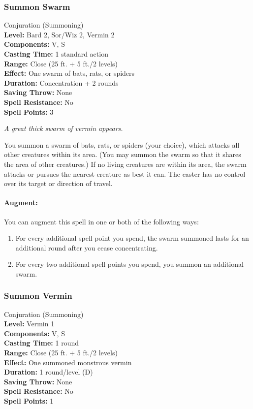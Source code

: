 \subsubsection{Summon Swarm}
\label{Spell:SummonSwarm}
Conjuration (Summoning)
\\ \textbf{Level:} Bard 2, Sor/Wiz 2, Vermin 2
\\ \textbf{Components:} V, S
\\ \textbf{Casting Time:} 1 standard action
\\ \textbf{Range:} Close (25 ft. + 5 ft./2 levels)
\\ \textbf{Effect:} One swarm of bats, rats, or spiders
\\ \textbf{Duration:} Concentration + 2 rounds
\\ \textbf{Saving Throw:} None
\\ \textbf{Spell Resistance:} No
\\ \textbf{Spell Points:} 3

\emph{A great thick swarm of vermin appears.}

You summon a swarm of bats, rats, or spiders (your choice), which attacks all other creatures within its area. (You may summon the swarm so that it shares the area of other creatures.) If no living creatures are within its area, the swarm attacks or pursues the nearest creature as best it can. The caster has no control over its target or direction of travel.

\paragraph{Augment:} You can augment this spell in one or both of the following ways:
\begin{enumerate}
 \item For every additional spell point you spend, the swarm summoned lasts for an additional round after you cease concentrating.
 \item For every two additional spell points you spend, you summon an additional swarm.
\end{enumerate}
\subsubsection{Summon Vermin}
\label{Spell:SummonVermin}
Conjuration (Summoning)
\\ \textbf{Level:} Vermin 1
\\ \textbf{Components:} V, S
\\ \textbf{Casting Time:} 1 round
\\ \textbf{Range:} Close (25 ft. + 5 ft./2 levels)
\\ \textbf{Effect:} One summoned monstrous vermin
\\ \textbf{Duration:} 1 round/level (D)
\\ \textbf{Saving Throw:} None
\\ \textbf{Spell Resistance:} No
\\ \textbf{Spell Points:} 1

